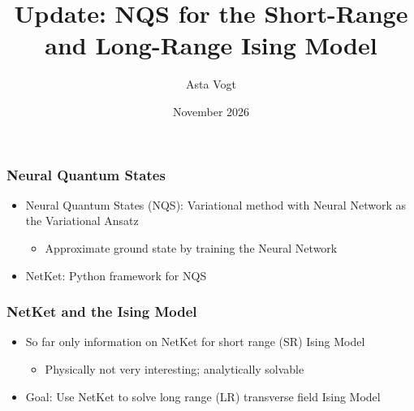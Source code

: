 \documentclass[aspectratio=169]{beamer}
\title{{Update: NQS for the Short-Range and Long-Range Ising Model}}
\author{Asta Vogt}
\date{November 2026}
\begin{document}
\setlength{\itemsep}{40mm}

\frame{\titlepage}



\begin{frame}
  \frametitle{Neural Quantum States}
  \begin{itemize}
    \item Neural Quantum States (NQS): Variational method with Neural Network as the Variational Ansatz
    \begin{itemize}
      \item Approximate ground state by training the Neural Network
    \end{itemize}
    \item NetKet: Python framework for NQS
  \end{itemize}
\end{frame}

\begin{frame}
  \frametitle{NetKet and the Ising Model}
  \begin{itemize}
    \item So far only information on NetKet for short range (SR) Ising Model
    \begin{itemize}
      \item Physically not very interesting; analytically solvable
    \end{itemize}
    \item Goal: Use NetKet to solve long range (LR) transverse field Ising Model
  \end{itemize}
\end{frame}
\end{document}
